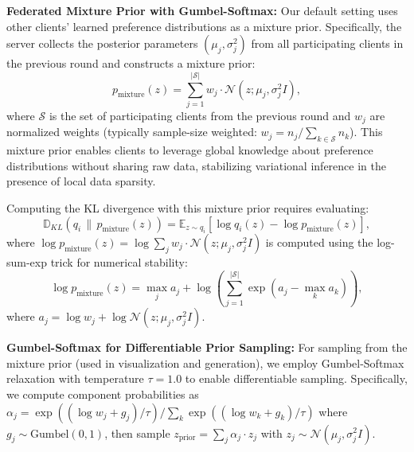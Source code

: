 \textbf{Federated Mixture Prior with Gumbel-Softmax:} Our default setting uses other clients' learned preference distributions as a mixture prior. Specifically, the server collects the posterior parameters $(\mu_j, \sigma_j^2)$ from all participating clients in the previous round and constructs a mixture prior:
\begin{equation}
    p_{\text{mixture}}(z) = \sum_{j=1}^{|\mathcal{S}|} w_j \cdot \mathcal{N}(z; \mu_j, \sigma_j^2 I),
\end{equation}
where $\mathcal{S}$ is the set of participating clients from the previous round and $w_j$ are normalized weights (typically sample-size weighted: $w_j = n_j / \sum_{k \in \mathcal{S}} n_k$). This mixture prior enables clients to leverage global knowledge about preference distributions without sharing raw data, stabilizing variational inference in the presence of local data sparsity.

Computing the KL divergence with this mixture prior requires evaluating:
\begin{equation}
    \mathbb{D}_{KL}(q_i \,\|\, p_{\text{mixture}}(z)) = \mathbb{E}_{z \sim q_i} \left[ \log q_i(z) - \log p_{\text{mixture}}(z) \right],
\end{equation}
where $\log p_{\text{mixture}}(z) = \log \sum_{j} w_j \cdot \mathcal{N}(z; \mu_j, \sigma_j^2 I)$ is computed using the log-sum-exp trick for numerical stability:
\begin{equation}
    \log p_{\text{mixture}}(z) = \max_j a_j + \log\left(\sum_{j=1}^{|\mathcal{S}|} \exp(a_j - \max_k a_k)\right),
\end{equation}
where $a_j = \log w_j + \log \mathcal{N}(z; \mu_j, \sigma_j^2 I)$.

\textbf{Gumbel-Softmax for Differentiable Prior Sampling:} For sampling from the mixture prior (used in visualization and generation), we employ Gumbel-Softmax relaxation \citep{jang2016categorical} with temperature $\tau = 1.0$ to enable differentiable sampling. Specifically, we compute component probabilities as $\alpha_j = \exp((\log w_j + g_j) / \tau) / \sum_k \exp((\log w_k + g_k) / \tau)$ where $g_j \sim \text{Gumbel}(0, 1)$, then sample $z_{\text{prior}} = \sum_j \alpha_j \cdot z_j$ with $z_j \sim \mathcal{N}(\mu_j, \sigma_j^2 I)$.

